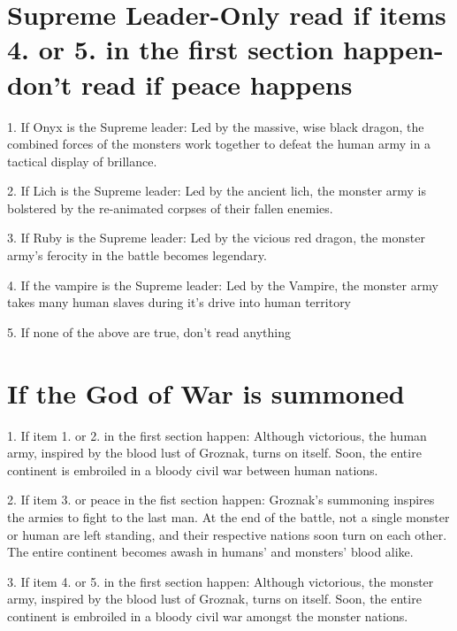 \documentclass[green]{guildcamp2}
\begin{document}
\section {Supreme Leader-Only read if items 4. or 5. in the first section happen-don't read if peace happens}
\begin{enum}
	\item 1. If Onyx is the Supreme leader: Led by the massive, wise black dragon, the combined forces of the monsters work together to defeat the human army in a tactical display of brillance.
	\item 2. If Lich is the Supreme leader: Led by the ancient lich, the monster army is bolstered by the re-animated corpses of their fallen enemies.
	\item 3. If Ruby is the Supreme leader: Led by the vicious red dragon, the monster army's ferocity in the battle becomes legendary.
	\item 4. If the vampire is the Supreme leader: Led by the Vampire, the monster army takes many human slaves during it's drive into human territory
	\item 5. If none of the above are true, don't read anything
	\end{enum}
\section {If the God of War is summoned}
	\begin{enum}
		\item 1. If item 1. or 2. in the first section happen: Although victorious, the human army, inspired by the blood lust of Groznak, turns on itself. Soon, the entire continent is embroiled in a bloody civil war between human nations.
		\item 2. If item 3. or peace in the fist section happen: Groznak's summoning inspires the armies to fight to the last man. At the end of the battle, not a single monster or human are left standing, and their respective nations soon turn on each other. The entire continent becomes awash in humans' and monsters' blood alike.
		\item 3. If item 4. or 5. in the first section happen: Although victorious, the monster army, inspired by the blood lust of Groznak, turns on itself. Soon, the entire continent is embroiled in a bloody civil war amongst the monster nations.
		\end{enum}
\end{document}
